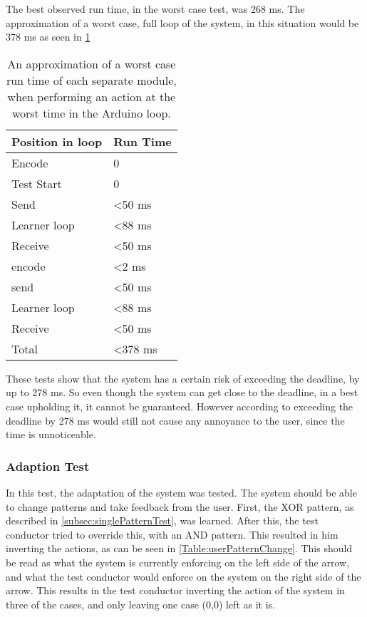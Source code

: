 The best observed run time, in the worst case test, was 268 ms. The approximation of a worst case, full loop of the system, in this situation would be 378 ms as seen in \cref{Table:WorstRunTimeAprox}

\begin{center}
	\begin{table}[htbp]
	  \centering
	  \begin{tabular}{l l}
		\toprule
		Position in loop		& Run Time  \\ \midrule
		Encode 			        & 0  	  	\\ \midrule
		Test Start		        & 0  		\\ \midrule
		Send   			        & <50 ms     \\ \midrule
		Learner loop 	        & <88 ms     \\ \midrule
		Receive 		        & <50 ms     \\ \midrule
		encode 			        & <2 ms      \\ \midrule
		send   			        & <50 ms     \\ \midrule
		Learner loop 	        & <88 ms	    \\ \midrule
		Receive 		        & <50 ms     \\ \midrule \midrule
		Total			        & <378 ms     \\
                                            \bottomrule
	  \end{tabular}
	  \caption{An approximation of a worst case run time of each separate module, when performing an action at the worst time in the Arduino loop.}\label{Table:WorstRunTimeAprox}
	\end{table}
\end{center}

These tests show that the system has a certain risk of exceeding the deadline, by up to 278 ms. So even though the system can get close to the deadline, in a best case upholding it, it cannot be guaranteed. However according to \cite{jakobnielsen} exceeding the deadline by 278 ms would still not cause any annoyance to the user, since the time is unnoticeable.

\subsubsection{Adaption Test}
In this test, the adaptation of the system was tested. The system should be able to change patterns and take feedback from the user. First, the XOR pattern, as described in \cref{subsec:singlePatternTest}, was learned. After this, the test conductor tried to override this, with an AND pattern. This resulted in him inverting the actions, as can be seen in \cref{Table:userPatternChange}. This should be read as what the system is currently enforcing on the left side of the arrow, and what the test conductor would enforce on the system on the right side of the arrow. This results in the test conductor inverting the action of the system in three of the cases, and only leaving one case (0,0) left as it is.

